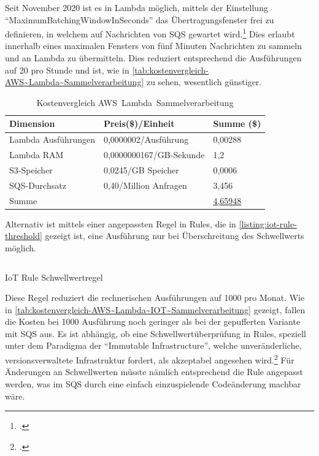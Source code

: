 Seit November 2020 ist es in Lambda möglich, mittels der Einstellung \enquote{MaximumBatchingWindowInSeconds} das Übertragungsfenster frei zu definieren, in welchem auf Nachrichten von \ac{SQS} gewartet wird.\footcite[Vgl. auch im Folgenden][]{AmazonWebServicesInc..2020b} Dies erlaubt innerhalb eines maximalen Fensters von fünf Minuten Nachrichten zu sammeln und an Lambda zu übermitteln. Dies reduziert entsprechend die Ausführungen auf 20 pro Stunde und ist, wie in \autoref{tab:kostenvergleich-AWS~Lambda~Sammelverarbeitung} zu sehen, wesentlich günstiger.

\begin{table}[H]
\centering
\begin{tabular}{|l|l|l|}
\hline
Dimension & Preis(\$)/Einheit & Summe (\$) \\ \hline
Lambda Ausführungen & 0,0000002/Ausführung & 0,00288 \\ \hline
Lambda \ac{RAM} & 0,0000000167/GB-Sekunde & 1,2 \\ \hline
\ac{S3}-Speicher & 0,0245/GB Speicher & 0,0006 \\ \hline
\ac{SQS}-Durchsatz & 0,40/Million Anfragen & 3,456 \\\hline
Summe &  & \underline{4,65948} \\ \hline
\end{tabular}
\caption{Kostenvergleich AWS~Lambda~Sammelverarbeitung}
\label{tab:kostenvergleich-AWS~Lambda~Sammelverarbeitung}
\end{table}


Alternativ ist mittels einer angepassten Regel in \AWSIOT{} Rules, die in \autoref{listing:iot-rule-threshold} gezeigt ist, eine Ausführung nur bei Überschreitung des Schwellwerts möglich.

\begin{listing}[H]
\inputminted[frame=lines,breaklines=true]{sql}{code/iot-rules-lambda-filter.sql}
\caption{IoT Rule Schwellwertregel}
\label{listing:iot-rule-threshold}
\end{listing}
Diese Regel reduziert die rechnerischen Ausführungen auf 1000 pro Monat. Wie in \autoref{tab:kostenvergleich-AWS~Lambda~IOT~Sammelverarbeitung} gezeigt, fallen die Kosten bei 1000 Ausführung noch geringer als bei der gepufferten Variante mit \ac{SQS} aus. Es ist abhängig, ob eine Schwellwertüberprüfung in \AWSIOT{} Rules, speziell unter dem Paradigma der \enquote{Immutable Infrastructure}, welche unveränderliche, versionsverwaltete Infrastruktur fordert, als akzeptabel angesehen wird.\footcite[Vgl.][]{AmazonWebServicesInc..o.J.p} Für Änderungen an Schwellwerten müsste nämlich entsprechend die \AWSIOT{} Rule angepasst werden, was im \ac{SQS} durch eine einfach einzuspielende Codeänderung machbar wäre.

